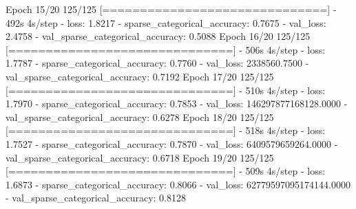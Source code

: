 \documentclass[
  12pt,
  a4paper,
]{article}
\newenvironment{Shaded}{}{}
\newcommand{\BuiltInTok}[1]{#1}
\newcommand{\DecValTok}[1]{\textcolor[rgb]{0.25,0.63,0.44}{#1}}
\newcommand{\FloatTok}[1]{\textcolor[rgb]{0.25,0.63,0.44}{#1}}
\newcommand{\NormalTok}[1]{#1}
\newcommand{\OperatorTok}[1]{\textcolor[rgb]{0.40,0.40,0.40}{#1}}
\begin{document}
\begin{Shaded}
\begin{Highlighting}[]
\NormalTok{Epoch }\DecValTok{15}\OperatorTok{/}\DecValTok{20}
\DecValTok{125}\OperatorTok{/}\DecValTok{125} \OperatorTok{[==============================]} \OperatorTok{{-}} \DecValTok{492}\BuiltInTok{s} \DecValTok{4}\BuiltInTok{s}\OperatorTok{/}\NormalTok{step }\OperatorTok{{-}}\NormalTok{ loss}\OperatorTok{:} \FloatTok{1.8217} \OperatorTok{{-}}\NormalTok{ sparse\_categorical\_accuracy}\OperatorTok{:} \FloatTok{0.7675} \OperatorTok{{-}}\NormalTok{ val\_loss}\OperatorTok{:} \FloatTok{2.4758} \OperatorTok{{-}}\NormalTok{ val\_sparse\_categorical\_accuracy}\OperatorTok{:} \FloatTok{0.5088}
\NormalTok{Epoch }\DecValTok{16}\OperatorTok{/}\DecValTok{20}
\DecValTok{125}\OperatorTok{/}\DecValTok{125} \OperatorTok{[==============================]} \OperatorTok{{-}} \DecValTok{506}\BuiltInTok{s} \DecValTok{4}\BuiltInTok{s}\OperatorTok{/}\NormalTok{step }\OperatorTok{{-}}\NormalTok{ loss}\OperatorTok{:} \FloatTok{1.7787} \OperatorTok{{-}}\NormalTok{ sparse\_categorical\_accuracy}\OperatorTok{:} \FloatTok{0.7760} \OperatorTok{{-}}\NormalTok{ val\_loss}\OperatorTok{:} \FloatTok{2338560.7500} \OperatorTok{{-}}\NormalTok{ val\_sparse\_categorical\_accuracy}\OperatorTok{:} \FloatTok{0.7192}
\NormalTok{Epoch }\DecValTok{17}\OperatorTok{/}\DecValTok{20}
\DecValTok{125}\OperatorTok{/}\DecValTok{125} \OperatorTok{[==============================]} \OperatorTok{{-}} \DecValTok{510}\BuiltInTok{s} \DecValTok{4}\BuiltInTok{s}\OperatorTok{/}\NormalTok{step }\OperatorTok{{-}}\NormalTok{ loss}\OperatorTok{:} \FloatTok{1.7970} \OperatorTok{{-}}\NormalTok{ sparse\_categorical\_accuracy}\OperatorTok{:} \FloatTok{0.7853} \OperatorTok{{-}}\NormalTok{ val\_loss}\OperatorTok{:} \FloatTok{146297877168128.0000} \OperatorTok{{-}}\NormalTok{ val\_sparse\_categorical\_accuracy}\OperatorTok{:} \FloatTok{0.6278}
\NormalTok{Epoch }\DecValTok{18}\OperatorTok{/}\DecValTok{20}
\DecValTok{125}\OperatorTok{/}\DecValTok{125} \OperatorTok{[==============================]} \OperatorTok{{-}} \DecValTok{518}\BuiltInTok{s} \DecValTok{4}\BuiltInTok{s}\OperatorTok{/}\NormalTok{step }\OperatorTok{{-}}\NormalTok{ loss}\OperatorTok{:} \FloatTok{1.7527} \OperatorTok{{-}}\NormalTok{ sparse\_categorical\_accuracy}\OperatorTok{:} \FloatTok{0.7870} \OperatorTok{{-}}\NormalTok{ val\_loss}\OperatorTok{:} \FloatTok{6409579659264.0000} \OperatorTok{{-}}\NormalTok{ val\_sparse\_categorical\_accuracy}\OperatorTok{:} \FloatTok{0.6718}
\NormalTok{Epoch }\DecValTok{19}\OperatorTok{/}\DecValTok{20}
\DecValTok{125}\OperatorTok{/}\DecValTok{125} \OperatorTok{[==============================]} \OperatorTok{{-}} \DecValTok{509}\BuiltInTok{s} \DecValTok{4}\BuiltInTok{s}\OperatorTok{/}\NormalTok{step }\OperatorTok{{-}}\NormalTok{ loss}\OperatorTok{:} \FloatTok{1.6873} \OperatorTok{{-}}\NormalTok{ sparse\_categorical\_accuracy}\OperatorTok{:} \FloatTok{0.8066} \OperatorTok{{-}}\NormalTok{ val\_loss}\OperatorTok{:} \FloatTok{62779597095174144.0000} \OperatorTok{{-}}\NormalTok{ val\_sparse\_categorical\_accuracy}\OperatorTok{:} \FloatTok{0.8128}

\end{Highlighting}
\end{Shaded}
\end{document}
